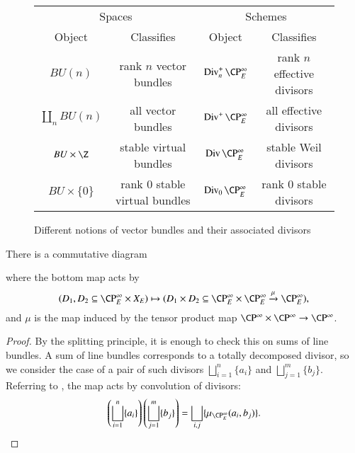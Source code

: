 \begin{figure}
\begin{center}
\begin{tabular}{@{}cccc@{}} \toprule
\multicolumn{2}{c}{Spaces} &
\multicolumn{2}{c}{Schemes}
\\
\cmidrule(r){1-2}
\cmidrule(r){3-4}
Object & Classifies & Object & Classifies \\ \midrule
$BU(n)$ & rank $n$ vector bundles & $\Div_n^+ \CP^\infty_E$ & rank $n$ effective divisors \\
$\coprod_n BU(n)$ & all vector bundles & $\Div^+ \CP^\infty_E$ & all effective divisors \\
$BU \times \Z$ & stable virtual bundles & $\Div \CP^\infty_E$ & stable Weil divisors \\
$BU \times \{0\}$ & rank $0$ stable virtual bundles & $\Div_0 \CP^\infty_E$ & rank $0$ stable divisors \\ \bottomrule
\end{tabular}
\end{center}
\caption{Different notions of vector bundles and their associated divisors}
\end{figure}

\begin{corollary}\label{ProductMapOfDivisorSchemes}
There is a commutative diagram
\begin{center}
\end{center}
where the bottom map acts by \[(D_1, D_2 \subseteq \CP^\infty_E \times X_E) \mapsto (D_1 \times D_2 \subseteq \CP^\infty_E \times \CP^\infty_E \xrightarrow{\mu} \CP^\infty_E),\] and $\mu$ is the map induced by the tensor product map $\CP^\infty \times \CP^\infty \to \CP^\infty$.
\end{corollary}
\begin{proof}
By the splitting principle, it is enough to check this on sums of line bundles.  A sum of line bundles corresponds to a totally decomposed divisor, so we consider the case of a pair of such divisors $\bigsqcup_{i=1}^n \{a_i\}$ and $\bigsqcup_{j=1}^m \{b_j\}$.  Referring to , the map acts by convolution of divisors: \[\left(\bigsqcup_{i=1}^n \{a_i\} \right) \left( \bigsqcup_{j=1}^m \{b_j\} \right) = \bigsqcup_{i, j} \{\mu_{\CP^\infty_E}(a_i, b_j)\}. \qedhere\]
\end{proof}

